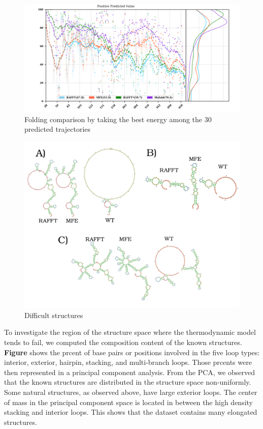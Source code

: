 \documentclass[a4paper,12pt]{article}
\begin{document}
{{\begin{figure}[htbp]
\centering
\includegraphics[width=.9\linewidth]{img/fold_perf_pvv.png}
\caption{Folding comparison by taking the best energy among the 30 predicted trajectories}
\end{figure}

\begin{figure}[htbp]
\centering
\includegraphics[width=.9\linewidth]{img/comb_rna_struct.png}
\caption{Difficult structures}
\end{figure}

To investigate the region of the structure space where the thermodynamic model
tends to fail, we computed the composition content of the known structures.
\textbf{Figure} shows the prcent of base pairs or positions involved in the five loop
types: interior, exterior, hairpin, stacking, and multi-branch loops. Those
prcents were then represented in a principal component analysis. From the PCA,
we observed that the known structures are distributed in the structure space
non-uniformly. Some natural structures, as observed above, have large exterior
loops. The center of mass in the principal component space is located in between
the high density stacking and interior loops. This shows that the dataset
contains many elongated structures.

}}
\end{document}
